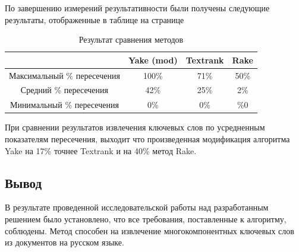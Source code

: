 По завершению измерений результативности были получены следующие результаты, отображенные в таблице на странице \pageref{table:experiment31}
\begin{table}[!h]
	\begin{tabular}{|c|c|c|c|}
		\hline
		& Yake (mod) & Textrank & Rake \\
		\hline
		Максимальный \% пересечения & 100\% & 71\% & 50\% \\
		\hline
		Средний \% пересечения & 42\% & 25\% & 2\% \\
		\hline
		Минимальный \% пересечения & 0\% & 0\% & \%0 \\
		\hline
	\end{tabular}
	\label{table:experiment31}
	\caption{Результат сравнения методов}
\end{table}
При сравнении результатов извлечения ключевых слов по усредненным показателям пересечения, выходит что произведенная модификация алгоритма Yake на 17\%  точнее Textrank и на 40\% метод Rake.


\subsection{Вывод}
В результате проведенной исследовательской работы над разработанным решением было установлено, что все требования, поставленные к алгоритму, соблюдены.
Метод способен на извлечение многокомпонентных ключевых слов из документов на русском языке. 
